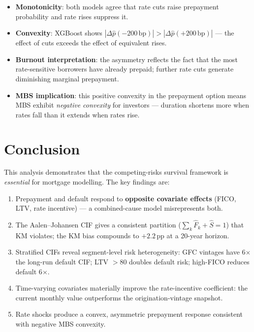 \documentclass[11pt,a4paper]{article}
\begin{document}
\begin{itemize}[leftmargin=1.4em,itemsep=2pt]
  \item \textbf{Monotonicity}: both models agree that rate cuts raise
        prepayment probability and rate rises suppress it.
  \item \textbf{Convexity}: XGBoost shows $|\Delta\hat{p}(-200\,\text{bp})|
        > |\Delta\hat{p}(+200\,\text{bp})|$ --- the effect of cuts
        exceeds the effect of equivalent rises.
  \item \textbf{Burnout interpretation}: the asymmetry reflects the fact
        that the most rate-sensitive borrowers have already prepaid;
        further rate cuts generate diminishing marginal prepayment.
  \item \textbf{MBS implication}: this positive convexity in the
        prepayment option means MBS exhibit \emph{negative convexity}
        for investors --- duration shortens more when rates fall than it
        extends when rates rise.
\end{itemize}

\section{Conclusion}

This analysis demonstrates that the competing-risks survival framework
is \emph{essential} for mortgage modelling.  The key findings are:

\begin{enumerate}[leftmargin=1.6em,itemsep=2pt]
  \item Prepayment and default respond to \textbf{opposite covariate
        effects} (FICO, LTV, rate incentive) --- a combined-cause model
        misrepresents both.
  \item The Aalen--Johansen CIF gives a consistent partition
        ($\sum_k \hat{F}_k + \hat{S} = 1$) that KM violates; the KM
        bias compounds to $+2.2$\,pp at a 20-year horizon.
  \item Stratified CIFs reveal segment-level risk heterogeneity: GFC
        vintages have 6$\times$ the long-run default CIF; LTV $>80$
        doubles default risk; high-FICO reduces default 6$\times$.
  \item Time-varying covariates materially improve the rate-incentive
        coefficient: the current monthly value outperforms the
        origination-vintage snapshot.
  \item Rate shocks produce a convex, asymmetric prepayment response
        consistent with negative MBS convexity.
\end{enumerate}
\end{document}

